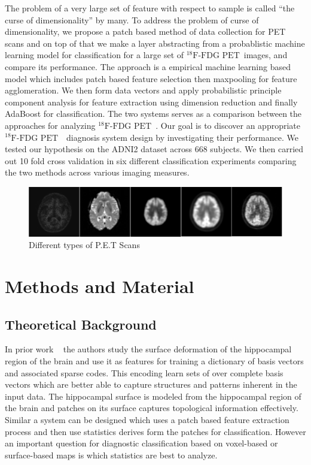 \documentclass[authoryear,preprint,revi	ew,12pt]{elsarticle}
\newcommand{\FDGPET}   {$ ^{18}\textrm{F-FDG PET} $~}
\begin{document}
The problem of a very large set of feature with respect to sample is called ``the curse of dimensionality'' by many. To address the problem of curse of dimensionality, we propose a patch based method of data collection for PET scans and on top of that we make a layer abstracting from a probablistic machine learning model for classification for a large set of \FDGPET images, and compare its performance. The approach is a empirical machine learning based model which includes patch based feature selection then maxpooling \citep{boureau2010theoretical} for feature agglomeration. We then form data vectors and apply probabilistic principle component analysis for feature extraction using dimension reduction and finally AdaBoost \citep{rojas2009adaboost} for classification. The two systems serves as a comparison between the approaches for analyzing \FDGPET. Our goal is to discover an appropriate \FDGPET ~diagnosis system design by investigating their performance. We tested our hypothesis on the ADNI2 dataset across $668$ subjects. We then carried out 10 fold cross validation in six different classification experiments comparing the two methods across various imaging measures.

\begin{figure}[h]
	\centering
	\includegraphics[width=\linewidth]{figures/pet_raw.png}
	\caption{Different types of P.E.T Scans}
	\label{fig:pet_raw}
\end{figure}	
	
\section{Methods and Material}

\subsection{Theoretical Background}
\label{sec:theoritical_background}

In prior work ~\cite{zhang2016applying} the authors study the surface deformation of the hippocampal region of the brain and use it as features for training a dictionary of basis vectors and associated sparse codes. This encoding learn sets of over complete basis vectors which are better able to capture structures and patterns inherent in the input data. The hippocampal surface is modeled from the hippocampal region of the brain and patches on its surface captures topological information effectively. Similar a system can be designed which uses a patch based feature extraction process and then use statistics derives form the patches for classification. However an important question for diagnostic classification based on voxel-based or surface-based maps is which statistics are best to analyze. 
\end{document}
